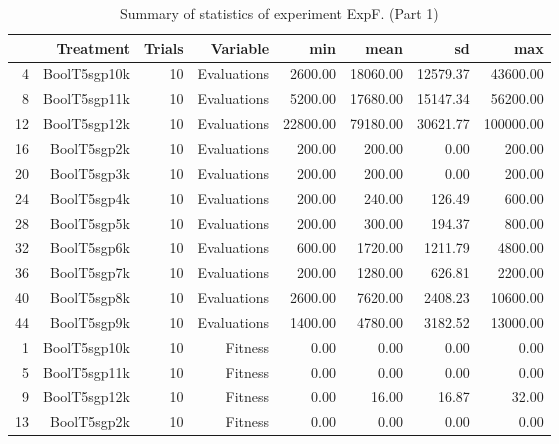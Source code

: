 \begin{table}[ht]
\centering
\begin{tabular}{rrrrrrrr}
  \hline
 & Treatment & Trials & Variable & min & mean & sd & max \\ 
  \hline
4 & BoolT5sgp10k &  10 & Evaluations & 2600.00 & 18060.00 & 12579.37 & 43600.00 \\ 
  8 & BoolT5sgp11k &  10 & Evaluations & 5200.00 & 17680.00 & 15147.34 & 56200.00 \\ 
  12 & BoolT5sgp12k &  10 & Evaluations & 22800.00 & 79180.00 & 30621.77 & 100000.00 \\ 
  16 & BoolT5sgp2k &  10 & Evaluations & 200.00 & 200.00 & 0.00 & 200.00 \\ 
  20 & BoolT5sgp3k &  10 & Evaluations & 200.00 & 200.00 & 0.00 & 200.00 \\ 
  24 & BoolT5sgp4k &  10 & Evaluations & 200.00 & 240.00 & 126.49 & 600.00 \\ 
  28 & BoolT5sgp5k &  10 & Evaluations & 200.00 & 300.00 & 194.37 & 800.00 \\ 
  32 & BoolT5sgp6k &  10 & Evaluations & 600.00 & 1720.00 & 1211.79 & 4800.00 \\ 
  36 & BoolT5sgp7k &  10 & Evaluations & 200.00 & 1280.00 & 626.81 & 2200.00 \\ 
  40 & BoolT5sgp8k &  10 & Evaluations & 2600.00 & 7620.00 & 2408.23 & 10600.00 \\ 
  44 & BoolT5sgp9k &  10 & Evaluations & 1400.00 & 4780.00 & 3182.52 & 13000.00 \\ 
  1 & BoolT5sgp10k &  10 & Fitness & 0.00 & 0.00 & 0.00 & 0.00 \\ 
  5 & BoolT5sgp11k &  10 & Fitness & 0.00 & 0.00 & 0.00 & 0.00 \\ 
  9 & BoolT5sgp12k &  10 & Fitness & 0.00 & 16.00 & 16.87 & 32.00 \\ 
  13 & BoolT5sgp2k &  10 & Fitness & 0.00 & 0.00 & 0.00 & 0.00 \\ 
   \hline
\end{tabular}
\caption{Summary of statistics of experiment ExpF. (Part 1)} 
\end{table}
